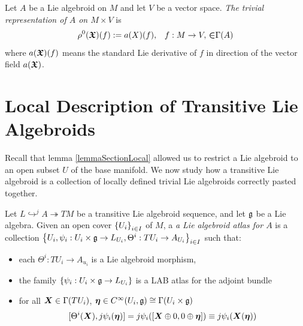 \begin{definition}
Let $A$ be a Lie algebroid on $M$ and let $V$ be a vector space. \emph{The trivial representation of $A$ on $M \times V$} is
\begin{align*}
    \rho^0(\bm{\mathfrak{X}})(f) := a(X)(f), && f: M \to V,\, \bm{\mathfrak{\in}} \Gamma(A)
\end{align*}
where $a(\bm{\mathfrak{X}})(f)$ means the standard Lie derivative of $f$ in direction of the vector field $a(\bm{\mathfrak{X}})$.
\end{definition}




\section{Local Description of Transitive Lie Algebroids}

Recall that lemma \ref{lemmaSectionLocal} allowed us to restrict a Lie algebroid to an open subset $U$ of the base manifold. We now study how a transitive Lie algebroid is a collection of locally defined trivial Lie algebroids correctly pasted together.

\begin{definition}
Let $L \hookrightarrow^j A \twoheadrightarrow TM$ be a transitive Lie algebroid sequence, and let $\mathfrak{g}$ be a Lie algebra. Given an open cover $\left\{ U_i \right\}_{i \in I}$ of $M$, a \emph{a Lie algebroid atlas for $A$} is a collection $\left\{ U_i, \psi_i:U_i \times \mathfrak{g} \to L_{U_i}, \Theta^i: TU_i \to A_{U_i} \right\}_{i \in I}$ such that:
    \begin{itemize}
    
    \item each $\Theta^i: TU_i \to A_{u_i}$ is a Lie algebroid morphism,
    
    \item the family $\left\{ \psi_i:U_i \times \mathfrak{g} \to L_{U_i} \right\}$ is a LAB atlas for the adjoint bundle 
    
    \item for all $\bm{X} \in \Gamma(TU_i)$, $\bm{\eta} \in C^\infty(U_i, \mathfrak{g}) \cong \Gamma(U_i \times \mathfrak{g})$
        \begin{align} \label{eqnCompLocal}
            [\Theta^i(\bm{X}), j\psi_i(\bm{\eta})] = j\psi_i([\bm{X} \oplus 0, 0 \oplus \bm{\eta}]) \equiv j\psi_i(\bm{X}(\bm{\eta})) 
        \end{align}
    
    \end{itemize}
\end{definition}

